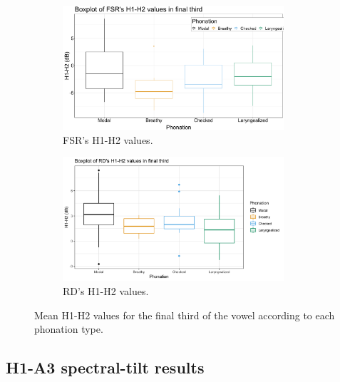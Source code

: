 \documentclass[12pt, letterpaper]{article}
\begin{document}
\begin{figure}[!h]
	\centering
	\begin{subfigure}{.5\textwidth}
		\centering
		\includegraphics[width=0.9\textwidth]{../mean_FSR_h1h2_3rd.png}
		\caption{FSR's H1-H2 values.}
		\label{fig:FSRh1h2third} 
	\end{subfigure}%
	\begin{subfigure}{.5\textwidth}
		\centering
		\includegraphics[width=0.9\textwidth]{../mean_RD_h1h2_3rd.png}
		\caption{RD's H1-H2 values.}
		\label{fig:RDh1h2third} 
	\end{subfigure}
	\caption{Mean H1-H2 values for the final third of the vowel according to each phonation type. }
	\label{fig:h1h2third}
\end{figure}
\subsection{H1-A3 spectral-tilt results} \label{sec:H1A3}
\end{document}
